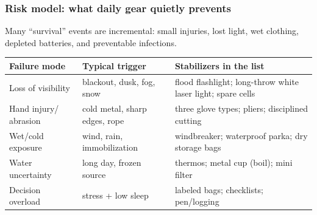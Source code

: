 \begin{frame}[t]
  \frametitle{Risk model: what daily gear quietly prevents}
  \justifying
  Many ``survival'' events are incremental: small injuries, lost light, wet clothing, depleted batteries, and preventable infections.

  \vspace{0.6em}
  \TableBodySize
  \begin{table}
    \centering
    \begin{tabularx}{\textwidth}{@{}lX X@{}}
      \toprule
      \textbf{Failure mode} & \textbf{Typical trigger} & \textbf{Stabilizers in the list} \\
      \midrule
      Loss of visibility & blackout, dusk, fog, snow & flood flashlight; long-throw white laser light; spare cells \\
      Hand injury/ abrasion & cold metal, sharp edges, rope & three glove types; pliers; disciplined cutting \\
      Wet/cold exposure & wind, rain, immobilization & windbreaker; waterproof parka; dry storage bags \\
      Water uncertainty & long day, frozen source & thermos; metal cup (boil); mini filter \\
      Decision overload & stress + low sleep & labeled bags; checklists; pen/logging \\
      \bottomrule
    \end{tabularx}
  \end{table}
\end{frame}


